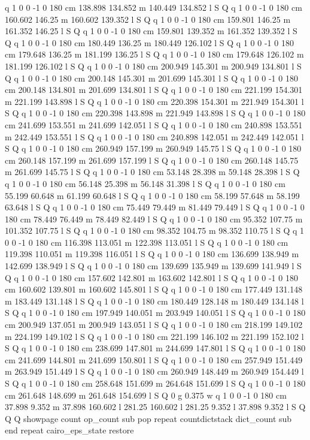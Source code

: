 q 1 0 0 -1 0 180 cm
138.898 134.852 m 140.449 134.852 l S Q
q 1 0 0 -1 0 180 cm
160.602 146.25 m 160.602 139.352 l S Q
q 1 0 0 -1 0 180 cm
159.801 146.25 m 161.352 146.25 l S Q
q 1 0 0 -1 0 180 cm
159.801 139.352 m 161.352 139.352 l S Q
q 1 0 0 -1 0 180 cm
180.449 136.25 m 180.449 126.102 l S Q
q 1 0 0 -1 0 180 cm
179.648 136.25 m 181.199 136.25 l S Q
q 1 0 0 -1 0 180 cm
179.648 126.102 m 181.199 126.102 l S Q
q 1 0 0 -1 0 180 cm
200.949 145.301 m 200.949 134.801 l S Q
q 1 0 0 -1 0 180 cm
200.148 145.301 m 201.699 145.301 l S Q
q 1 0 0 -1 0 180 cm
200.148 134.801 m 201.699 134.801 l S Q
q 1 0 0 -1 0 180 cm
221.199 154.301 m 221.199 143.898 l S Q
q 1 0 0 -1 0 180 cm
220.398 154.301 m 221.949 154.301 l S Q
q 1 0 0 -1 0 180 cm
220.398 143.898 m 221.949 143.898 l S Q
q 1 0 0 -1 0 180 cm
241.699 153.551 m 241.699 142.051 l S Q
q 1 0 0 -1 0 180 cm
240.898 153.551 m 242.449 153.551 l S Q
q 1 0 0 -1 0 180 cm
240.898 142.051 m 242.449 142.051 l S Q
q 1 0 0 -1 0 180 cm
260.949 157.199 m 260.949 145.75 l S Q
q 1 0 0 -1 0 180 cm
260.148 157.199 m 261.699 157.199 l S Q
q 1 0 0 -1 0 180 cm
260.148 145.75 m 261.699 145.75 l S Q
q 1 0 0 -1 0 180 cm
53.148 28.398 m 59.148 28.398 l S Q
q 1 0 0 -1 0 180 cm
56.148 25.398 m 56.148 31.398 l S Q
q 1 0 0 -1 0 180 cm
55.199 60.648 m 61.199 60.648 l S Q
q 1 0 0 -1 0 180 cm
58.199 57.648 m 58.199 63.648 l S Q
q 1 0 0 -1 0 180 cm
75.449 79.449 m 81.449 79.449 l S Q
q 1 0 0 -1 0 180 cm
78.449 76.449 m 78.449 82.449 l S Q
q 1 0 0 -1 0 180 cm
95.352 107.75 m 101.352 107.75 l S Q
q 1 0 0 -1 0 180 cm
98.352 104.75 m 98.352 110.75 l S Q
q 1 0 0 -1 0 180 cm
116.398 113.051 m 122.398 113.051 l S Q
q 1 0 0 -1 0 180 cm
119.398 110.051 m 119.398 116.051 l S Q
q 1 0 0 -1 0 180 cm
136.699 138.949 m 142.699 138.949 l S Q
q 1 0 0 -1 0 180 cm
139.699 135.949 m 139.699 141.949 l S Q
q 1 0 0 -1 0 180 cm
157.602 142.801 m 163.602 142.801 l S Q
q 1 0 0 -1 0 180 cm
160.602 139.801 m 160.602 145.801 l S Q
q 1 0 0 -1 0 180 cm
177.449 131.148 m 183.449 131.148 l S Q
q 1 0 0 -1 0 180 cm
180.449 128.148 m 180.449 134.148 l S Q
q 1 0 0 -1 0 180 cm
197.949 140.051 m 203.949 140.051 l S Q
q 1 0 0 -1 0 180 cm
200.949 137.051 m 200.949 143.051 l S Q
q 1 0 0 -1 0 180 cm
218.199 149.102 m 224.199 149.102 l S Q
q 1 0 0 -1 0 180 cm
221.199 146.102 m 221.199 152.102 l S Q
q 1 0 0 -1 0 180 cm
238.699 147.801 m 244.699 147.801 l S Q
q 1 0 0 -1 0 180 cm
241.699 144.801 m 241.699 150.801 l S Q
q 1 0 0 -1 0 180 cm
257.949 151.449 m 263.949 151.449 l S Q
q 1 0 0 -1 0 180 cm
260.949 148.449 m 260.949 154.449 l S Q
q 1 0 0 -1 0 180 cm
258.648 151.699 m 264.648 151.699 l S Q
q 1 0 0 -1 0 180 cm
261.648 148.699 m 261.648 154.699 l S Q
0 g
0.375 w
q 1 0 0 -1 0 180 cm
37.898 9.352 m 37.898 160.602 l 281.25 160.602 l 281.25 9.352 l 37.898 
9.352 l S Q
Q Q
showpage
count op_count sub {pop} repeat
countdictstack dict_count sub {end} repeat
cairo_eps_state restore
